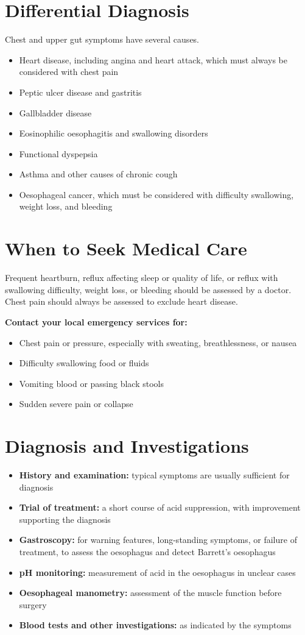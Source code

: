 \section*{Differential Diagnosis}
Chest and upper gut symptoms have several causes.
\begin{itemize}
    \item Heart disease, including angina and heart attack, which must always be considered with chest pain
    \item Peptic ulcer disease and gastritis
    \item Gallbladder disease
    \item Eosinophilic oesophagitis and swallowing disorders
    \item Functional dyspepsia
    \item Asthma and other causes of chronic cough
    \item Oesophageal cancer, which must be considered with difficulty swallowing, weight loss, and bleeding
\end{itemize}

\section*{When to Seek Medical Care}
Frequent heartburn, reflux affecting sleep or quality of life, or reflux with swallowing difficulty, weight loss, or bleeding should be assessed by a doctor. Chest pain should always be assessed to exclude heart disease.

\textbf{Contact your local emergency services for:}
\begin{itemize}
    \item Chest pain or pressure, especially with sweating, breathlessness, or nausea
    \item Difficulty swallowing food or fluids
    \item Vomiting blood or passing black stools
    \item Sudden severe pain or collapse
\end{itemize}

\section*{Diagnosis and Investigations}
\begin{itemize}
    \item \textbf{History and examination:} typical symptoms are usually sufficient for diagnosis
    \item \textbf{Trial of treatment:} a short course of acid suppression, with improvement supporting the diagnosis
    \item \textbf{Gastroscopy:} for warning features, long-standing symptoms, or failure of treatment, to assess the oesophagus and detect Barrett's oesophagus
    \item \textbf{pH monitoring:} measurement of acid in the oesophagus in unclear cases
    \item \textbf{Oesophageal manometry:} assessment of the muscle function before surgery
    \item \textbf{Blood tests and other investigations:} as indicated by the symptoms
\end{itemize}

